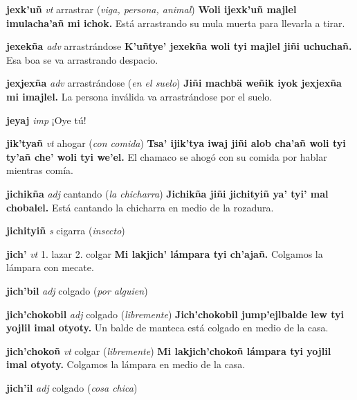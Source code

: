\documentclass[10pt]{scrbook}
\newcommand{\entry}[1]{\textbf{#1}}
\newcommand{\onedefinition}[1]{#1.}
\newcommand{\partofspeech}[1]{\textit{#1}}
\newcommand{\spanishtranslation}[1]{#1}
\newcommand{\clarification}[1]{(\textit{#1})}
\newcommand{\cholexample}[1]{\textbf{#1}}
\newcommand{\exampletranslation}[1]{#1}
\begin{document}
\begin{multicols}{2}
\entry{jexk'uñ}
\partofspeech{vt}
\spanishtranslation{arrastrar}
\clarification{viga, persona, animal}
\cholexample{Woli ijexk'uñ majlel imulacha'añ mi ichok.}
\exampletranslation{Está arrastrando su mula muerta para llevarla a tirar.}

\entry{jexekña}
\partofspeech{adv}
\spanishtranslation{arrastrándose}
\cholexample{K'uñtye' jexekña woli tyi majlel jiñi uchuchañ.}
\exampletranslation{Esa boa se va arrastrando despacio.}

\entry{jexjexña}
\partofspeech{adv}
\spanishtranslation{arrastrándose}
\clarification{en el suelo}
\cholexample{Jiñi machbä weñik iyok jexjexña mi imajlel.}
\exampletranslation{La persona inválida va arrastrándose por el suelo.}

\entry{jeyaj}
\partofspeech{imp}
\spanishtranslation{¡Oye tú!}

\entry{jik'tyañ}
\partofspeech{vt}
\spanishtranslation{ahogar}
\clarification{con comida}
\cholexample{Tsa' ijik'tya iwaj jiñi alob cha'añ woli tyi ty'añ che' woli tyi we'el.}
\exampletranslation{El chamaco se ahogó con su comida por hablar mientras comía.}

\entry{jichikña}
\partofspeech{adj}
\spanishtranslation{cantando}
\clarification{la chicharra}
\cholexample{Jichikña jiñi jichityiñ ya' tyi' mal chobalel.}
\exampletranslation{Está cantando la chicharra en medio de la rozadura.}

\entry{jichityiñ}
\partofspeech{s}
\spanishtranslation{cigarra}
\clarification{insecto}

\entry{jich'}
\partofspeech{vt}
\onedefinition{1}
\spanishtranslation{lazar}
\onedefinition{2}
\spanishtranslation{colgar}
\cholexample{Mi lakjich' lámpara tyi ch'ajañ.}
\exampletranslation{Colgamos la lámpara con mecate.}

\entry{jich'bil}
\partofspeech{adj}
\spanishtranslation{colgado}
\clarification{por alguien}

\entry{jich'chokobil}
\partofspeech{adj}
\spanishtranslation{colgado}
\clarification{libremente}
\cholexample{Jich'chokobil jump'ejlbalde lew tyi yojlil imal otyoty.}
\exampletranslation{Un balde de manteca está colgado en medio de la casa.}

\entry{jich'chokoñ}
\partofspeech{vt}
\spanishtranslation{colgar}
\clarification{libremente}
\cholexample{Mi lakjich'chokoñ lámpara tyi yojlil imal otyoty.}
\exampletranslation{Colgamos la lámpara en medio de la casa.}

\entry{jich'il}
\partofspeech{adj}
\spanishtranslation{colgado}
\clarification{cosa chica}


\end{multicols}
\end{document}

